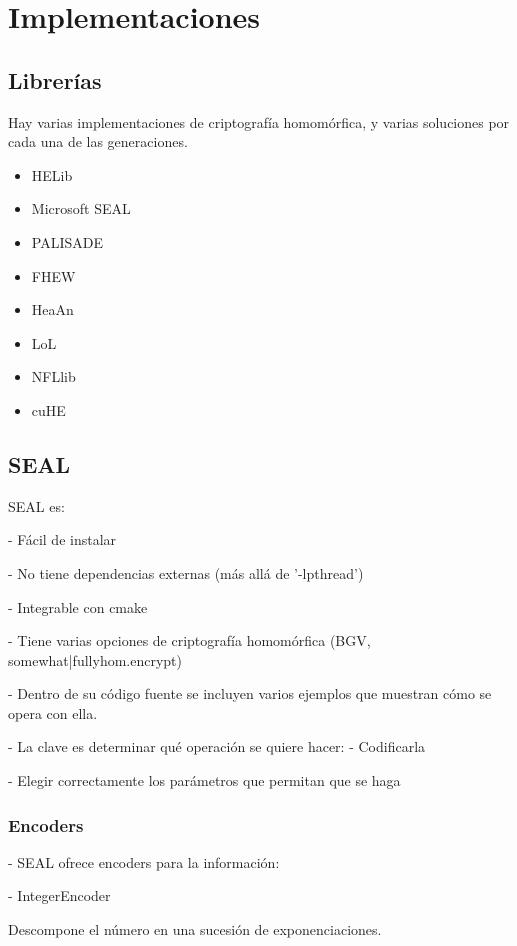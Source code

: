 \chapter{Implementaciones}

\section{Librerías}

Hay varias implementaciones de criptografía homomórfica, y varias soluciones por cada una de las generaciones.

\begin{itemize}
    \item HELib
    \item Microsoft SEAL
    \item PALISADE
    \item FHEW
    \item HeaAn
    \item LoL
    \item NFLlib
    \item cuHE
\end{itemize}{}

\section{SEAL}

SEAL es:

- Fácil de instalar

- No tiene dependencias externas (más allá de '-lpthread')

- Integrable con cmake

- Tiene varias opciones de criptografía homomórfica (BGV, {somewhat|fully}hom.encrypt)

- Dentro de su código fuente se incluyen varios ejemplos que muestran cómo se opera con ella.

- La clave es determinar qué operación se quiere hacer:
    - Codificarla

    - Elegir correctamente los parámetros que permitan que se haga

\subsection{Encoders}

- SEAL ofrece encoders para la información:

    - IntegerEncoder

    Descompone el número en una sucesión de exponenciaciones.

